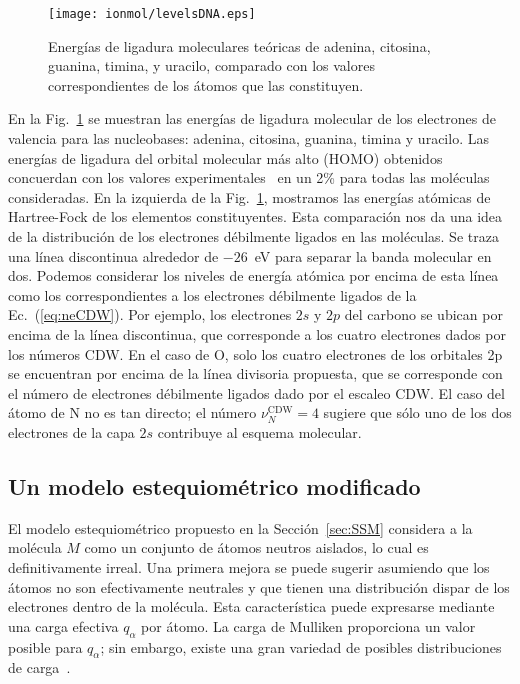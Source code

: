 \begin{figure}
\centering
\texttt{[image: ionmol/levelsDNA.eps]}
\caption[Energías de ligadura moleculares teóricas de ADN y ARN.]
{Energías de ligadura moleculares teóricas de adenina, citosina, guanina, 
timina, y uracilo, comparado con los valores correspondientes de los 
átomos que las constituyen.}
\label{fig:bindener}
\end{figure}

En la Fig.~\ref{fig:bindener} se muestran las energías de ligadura 
molecular de los electrones de valencia para las nucleobases: adenina, 
citosina, guanina, timina y uracilo. Las energías de ligadura del orbital 
molecular más alto (HOMO) obtenidos concuerdan con los valores 
experimentales~\cite{Hush,Verkin,Dougherty} en un 2\% para todas las 
moléculas consideradas. En la izquierda de la Fig.~\ref{fig:bindener}, 
mostramos las energías atómicas de Hartree-Fock de los elementos 
constituyentes. Esta comparación nos da una idea de la distribución de 
los electrones débilmente ligados en las moléculas. Se traza una línea 
discontinua alrededor de $-26$~eV para separar la banda molecular en dos. 
Podemos considerar los niveles de energía atómica por encima de esta 
línea como los correspondientes a los electrones débilmente ligados de la 
Ec.~(\ref{eq:neCDW}). Por ejemplo, los electrones $2s$ y $2p$ del 
carbono se ubican por encima de la línea discontinua, que corresponde a 
los cuatro electrones dados por los números CDW. En el caso de O, solo 
los cuatro electrones de los orbitales 2p se encuentran por encima de la 
línea divisoria propuesta, que se corresponde con el número de electrones
débilmente ligados dado por el escaleo CDW. El caso del átomo de N no es 
tan directo; el número $\nu_{N}^{\text{CDW}}=4$ sugiere que sólo uno de 
los dos electrones de la capa $2s$ contribuye al esquema molecular.

\subsection{Un modelo estequiométrico modificado}

El modelo estequiométrico propuesto en la Sección~\ref{sec:SSM} considera 
a la molécula $M$ como un conjunto de átomos neutros aislados, lo cual es 
definitivamente irreal. Una primera mejora se puede sugerir asumiendo que 
los átomos no son efectivamente neutrales y que tienen una distribución 
dispar de los electrones dentro de la molécula. Esta característica puede 
expresarse mediante una carga efectiva $q_{\alpha}$ por átomo. La carga 
de Mulliken proporciona un valor posible para $q_{\alpha}$; sin embargo, 
existe una gran variedad de posibles distribuciones de 
carga~\cite{lee2003}.

